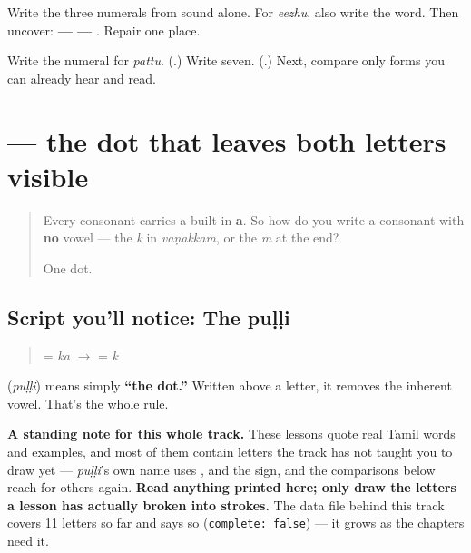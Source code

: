 Write the three numerals from sound alone. For \emph{eezhu}, also write the word. Then uncover: \textbf{ —   — }. Repair one place.

\begin{tcolorbox}[breakable,colback=teal!4,colframe=teal!35!black,title={Before you move on}]
Write the numeral for \emph{pattu}. (\textbf{}.) Write seven. (\textbf{}.) Next, compare only forms you can already hear and read.
\end{tcolorbox}
\section[\texorpdfstring{\ta{்} (puḷḷi)}{் (puḷḷi)}]{ — the dot that leaves both letters visible}

\label{lesson:TA-W03-pulli-vanakkam}



\begin{quote}
Every consonant carries a built-in \textbf{a}. So how do you write a consonant with \textbf{no} vowel — the \emph{k} in \emph{vaṇakkam}, or the \emph{m} at the end?

One dot.
\end{quote}

\subsection*{Script you'll notice: The puḷḷi}

\begin{quote}
\textbf{} = \emph{ka}  $\to$  \textbf{} = \emph{k}
\end{quote}

\textbf{} (\emph{puḷḷi}) means simply \textbf{\textquotedblleft{}the dot.\textquotedblright{}} Written above a letter, it removes the inherent vowel. That's the whole rule.

\textbf{A standing note for this whole track.} These lessons quote real Tamil words and examples, and most of them contain letters the track has not taught you to draw yet — \emph{puḷḷi}'s own name uses \textbf{}, \textbf{} and the \textbf{} sign, and the comparisons below reach for others again. \textbf{Read anything printed here; only draw the letters a lesson has actually broken into strokes.} The data file behind this track covers 11 letters so far and says so (\texttt{complete: false}) — it grows as the chapters need it.

